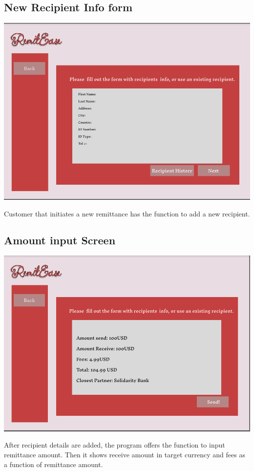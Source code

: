 \documentclass[onecolumn, letterpaper, ]{report}
\begin{document}
    \begin{landscape}
        \subsection{New Recipient Info form} 
        \includegraphics[width=.97\linewidth]{MockUps/3ReceipientsInfoForm.PNG} 

        Customer that initiates a new remittance has the function to add a new recipient.
    \end{landscape}
    
        
    \begin{landscape}
        \subsection{Amount input Screen}
        \includegraphics[width=.97\linewidth]{MockUps/AmountScreen.PNG}

        After recipient details are added, the program offers the function to input remittance amount. Then it shows receive amount in target currency and fees as a function of remittance amount.
    \end{landscape}
\end{document}
